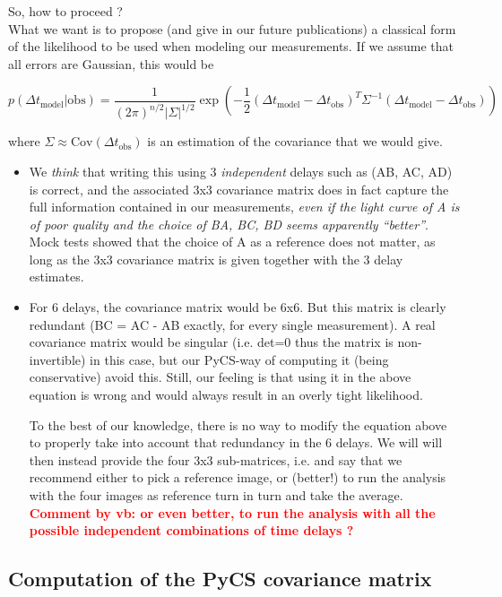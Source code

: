 \documentclass[11pt]{scrartcl}
\newcommand{\com}[2]{\xspace\textcolor{red}{\textbf{Comment by #1: #2}}}
\newcommand{\dt}[1]{\ensuremath{\Delta t_{\mathrm{#1}}}\xspace}
\begin{document}
So, how to proceed ?\\

What we want is to propose (and give in our future publications) a 
classical form of the likelihood to be used when modeling our 
measurements. If we assume that all errors are Gaussian, this 
would be

\begin{equation}
p(\dt{model} | \mathrm{obs}) = \frac{1}{(2 \pi)^{n/2} 
|\Sigma|^{1/2}}\exp\left( -\frac{1}{2} 
(\dt{model}-\dt{obs})^T\Sigma^{-1}(\dt{model}-\dt{obs}) \right)
\end{equation}

where $\Sigma \approx \textrm{Cov}(\dt{obs})$ is an estimation of the 
covariance that we would give.


\begin{itemize}
\item We \emph{think} that writing this using 3 \emph{independent} 
delays such as (AB, AC, 
AD) is correct, and the associated 3x3 covariance matrix does in fact 
capture the full information contained in our measurements, \emph{even 
if the light curve of A is of poor quality and the choice of BA, BC, BD 
seems apparently ``better''}. Mock tests showed that the choice of A as 
a reference does not 
matter, as long as the 3x3 covariance matrix is given together with the 
3 delay estimates.


\item For 6 delays, the covariance matrix would be 6x6. But this matrix 
is clearly redundant (BC = AC - AB exactly, for every single 
measurement). A real covariance matrix would be singular (i.e. det=0 
thus the matrix is non-invertible) in this case, but our PyCS-way of 
computing it (being conservative) avoid this. Still, our feeling is 
that 
using it in the above equation is wrong and would always result in an 
overly 
tight likelihood.

To the best of our knowledge, there is no way to modify the equation 
above to properly take into account that redundancy in the 6 delays. We 
will will then instead provide the four 3x3 sub-matrices, i.e. and 
say that we recommend 
either to pick a reference image, or (better!) to run the analysis with 
the four images as reference turn in turn and take the average. 
\com{vb}{or even better, to run the analysis with all the possible 
independent combinations of time delays ?}

\end{itemize}

\subsection*{Computation of the PyCS covariance matrix}
\end{document}
